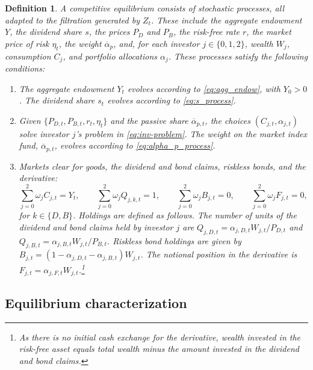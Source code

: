 \documentclass[12pt,english]{article}
\newtheorem{defn}{Definition}
\begin{document}
\begin{defn}
A competitive equilibrium consists of stochastic processes, all adapted to the filtration generated by $Z_t$.
These include the aggregate endowment $Y$, the dividend share $s$, the prices $P_D$ and $P_B$, the risk-free rate $r$, the market price of risk $\eta_t$,
the weight $\overline{\alpha}_p$, and, for each investor $j \in \{0,1,2\}$, wealth $W_j$, consumption $C_j$, and portfolio allocations $\alpha_j$.
These processes satisfy the following conditions:
\begin{enumerate}[label=(\roman*)]

\item The aggregate endowment $Y_t$ evolves according to \eqref{eq:agg_endow}, with $Y_0 > 0$.
The dividend share $s_t$ evolves according to \eqref{eq:s_process}.

\item Given $\{P_{D,t}, P_{B,t}, r_t, \eta_t\}$ and the passive share $\overline{\alpha}_{p,t}$, the choices $(C_{j,t},\alpha_{j,t})$ solve investor $j$'s problem in \eqref{eq:inv-problem}.
The weight on the market index fund, $\overline{\alpha}_{p,t}$, evolves according to \eqref{eq:alpha_p_process}.

\item Markets clear for goods, the dividend and bond claims, riskless bonds, and the derivative:
\begin{equation}
    \sum_{j=0}^2 \omega_j C_{j,t} = Y_t,
    \qquad
    \sum_{j=0}^2 \omega_j Q_{j,k,t} = 1, \qquad 
    \sum_{j=0}^2 \omega_j B_{j,t} = 0,
    \qquad
    \sum_{j=0}^2 \omega_j F_{j,t} = 0,
\end{equation}
for $k \in \{D,B\}$.
Holdings are defined as follows.
The number of units of the dividend and bond claims held by investor $j$ are $Q_{j,D,t} = \alpha_{j,D,t} W_{j,t} / P_{D,t}$ and $Q_{j,B,t} = \alpha_{j,B,t} W_{j,t} / P_{B,t}$.
Riskless bond holdings are given by $B_{j,t} = (1 - \alpha_{j,D,t} - \alpha_{j,B,t}) W_{j,t}$.
The notional position in the derivative is $F_{j,t} = \alpha_{j,F,t} W_{j,t}$.\footnote{
    As there is no initial cash exchange for the derivative, wealth invested in the risk-free asset equals total wealth minus the amount invested in the dividend and bond claims.
    }

\end{enumerate}
\end{defn}


\subsection{Equilibrium characterization}\label{sec:equilibrium-char}
\end{document}
